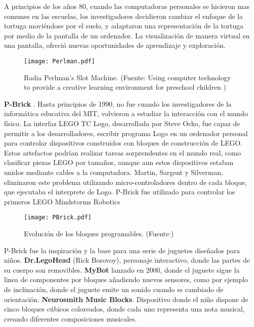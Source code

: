 A principios de los años 80, cuando las computadoras personales se hicieron mas comunes en las escuelas, los investigadores decidieron cambiar el enfoque de la tortuga moviéndose por el suelo, y adaptaron una representación de la tortuga por medio de la pantalla de un ordenador. La visualización de manera virtual en una pantalla, ofreció nuevas oportunidades de aprendizaje y exploración.

\begin{figure}[!h]
\begin{center}
\texttt{[image: Perlman.pdf]}
\caption{Radia Perlman’s Slot Machine. (Fuente: Using computer technology to provide a creative learning environment for preschool children  \cite{Perlman})}
\label{fig:Perlman}
\end{center}
\end{figure}

\textbf{P-Brick} \cite{LegoLogo}. Hasta principios de 1990, no fue cuando los investigadores de la informática educativa del MIT, volvieron a estudiar la interacción con el mundo físico. La interfaz LEGO TC Logo, desarrollada por Steve Ocko, fue capaz de permitir a los desarrolladores, escribir programa Logo en un ordenador personal para controlar dispositivos construidos con bloques de construcción de LEGO. Estos artefactos podrían realizar tareas sorprendentes en el mundo real, como clasificar piezas LEGO por tamaños, aunque aun estos dispositivos estaban unidos mediante cables a la computadora. Martin, Sargent y Silverman, eliminaron este problema utilizando micro-controladores dentro de cada bloque, que ejecutaba el interprete de Logo.
P-Brick fue utilizado para controlar los primeros LEGO Mindstorms Robotics

\begin{figure}[!h]
\begin{center}
\texttt{[image: PBrick.pdf]}
\caption{Evolución de los bloques programables. (Fuente:\cite{McNerney})}
\label{fig:PBrick}
\end{center}
\end{figure}

P-Brick fue la inspiración y la base para una serie de juguetes diseñados para niños. \textbf{Dr.LegoHead} (Rick Borovoy), personaje interactivo, donde las partes de su cuerpo son removibles. \textbf{MyBot} lanzado en 2000, donde el juguete sigue la linea de componentes por bloques añadiendo nuevos sensores, como por ejemplo de inclinación, donde el juguete emite un sonido cuando es cambiado de orientación.
\textbf{Neurosmith Music Blocks}. Dispositivo donde el niño dispone de cinco bloques cúbicos coloreados, donde cada uno representa una nota musical, creando diferentes composiciones musicales.

